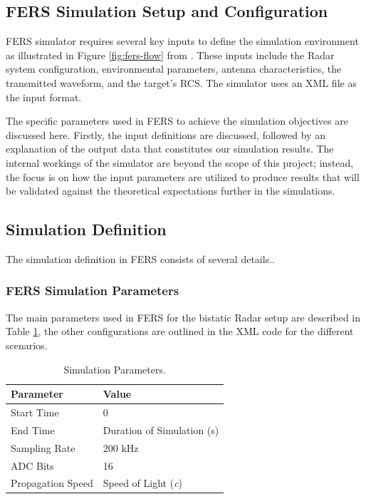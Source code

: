 \subsection{FERS Simulation Setup and Configuration}
\ac{FERS} simulator requires several key inputs to define the simulation environment as illustrated in Figure \ref{fig:fers-flow} from \cite{inggs2009extensible}. These inputs include the \ac{Radar} system configuration, environmental parameters, antenna characteristics, the transmitted waveform, and the target's \ac{RCS}. The simulator uses an \ac{XML} file as the input format.

The specific parameters used in \ac{FERS} to achieve the simulation objectives are discussed here. Firstly, the input definitions are discussed, followed by an explanation of the output data that constitutes our simulation results. The internal workings of the simulator are beyond the scope of this project; instead, the focus is on how the input parameters are utilized to produce results that will be validated against the theoretical expectations further in the simulations.


\subsection{Simulation Definition}
The simulation definition in \ac{FERS} consists of several details..

\subsubsection{FERS Simulation Parameters}

The main parameters used in \ac{FERS} for the bistatic \ac{Radar} setup are described in Table \ref{Sim_par_FERS}, the other configurations are outlined in the \ac{XML} code for the different scenarios.

\begin{table}[h]
\centering
\caption{Simulation Parameters.}
\label{Sim_par_FERS}
\begin{tabular}{ll}
\hline
\textbf{Parameter} & \textbf{Value} \\
\hline
Start Time & 0 \\
End Time & Duration of Simulation (s) \\
Sampling Rate & 200 kHz \\
\ac{ADC} Bits & 16 \\
Propagation Speed & Speed of Light (\textit{c}) \\
\hline
\end{tabular}
\end{table}

